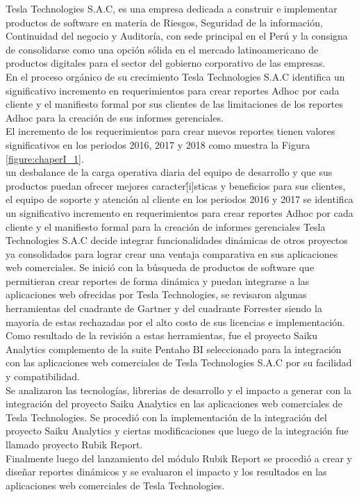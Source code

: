 \begin{spacing}{1.5}
	Tesla Technologies S.A.C, es una empresa dedicada a construir e implementar productos de software en materia de Riesgos, Seguridad de la información, Continuidad del negocio y Auditoría, con sede principal en el Perú y la consigna de consolidarse como una opci\'{o}n s\'{o}lida en el mercado latinoamericano de productos digitales para el sector del gobierno corporativo de las empresas.\\	                         
	En el proceso org\'{a}nico de su crecimiento Tesla Technologies S.A.C  identifica un significativo incremento en requerimientos para crear reportes Adhoc por cada cliente y el manifiesto formal por sus clientes de las limitaciones de los reportes Adhoc para la creación de sus informes gerenciales.\\
	El incremento de los requerimientos para crear nuevos reportes tienen valores significativos en los periodos 2016, 2017 y 2018 como muestra la Figura \ref{figure:chaperI_1}.\\	
	un desbalance de la carga operativa diaria del equipo de desarrollo y que sus productos puedan ofrecer mejores caracter\'[i]sticas y beneficios para sus clientes, el equipo de soporte y atenci\'{o}n al cliente  en los periodos 2016 y 2017 se identifica un significativo incremento en requerimientos para crear reportes Adhoc por cada cliente y el manifiesto formal   para la creación de informes gerenciales Tesla Technologies S.A.C decide integrar funcionalidades dinámicas de otros proyectos ya consolidados para lograr crear una ventaja comparativa en sus aplicaciones web comerciales.
	Se inició con la búsqueda de productos de software que permitieran crear reportes de forma dinámica y puedan integrarse a las aplicaciones web ofrecidas por Tesla Technologies, se revisaron algunas herramientas del cuadrante de Gartner y del cuadrante Forrester siendo la mayoria de estas rechazadas por el alto costo de sus licencias e implementación.\\
	Como resultado de la revisión a estas herramientas, fue el proyecto Saiku Analytics complemento de la suite Pentaho BI seleccionado para la integración con las aplicaciones web comerciales de Tesla Technologies S.A.C por su facilidad y compatibilidad.\\
	Se analizaron las tecnologías, librerias de desarrollo y el impacto a generar  con la integración del proyecto Saiku Analytics en las aplicaciones web comerciales de Tesla Technologies.
	Se procedió con la implementación de la integración del proyecto Saiku Analytics y ciertas modificaciones que luego de la integración fue llamado proyecto Rubik Report.\\
	Finalmente luego del lanzamiento del módulo Rubik Report se procedió a crear y diseñar reportes dinámicos y se evaluaron el impacto y los resultados en las aplicaciones web comerciales de Tesla Technologies.\\
	
\end{spacing}

